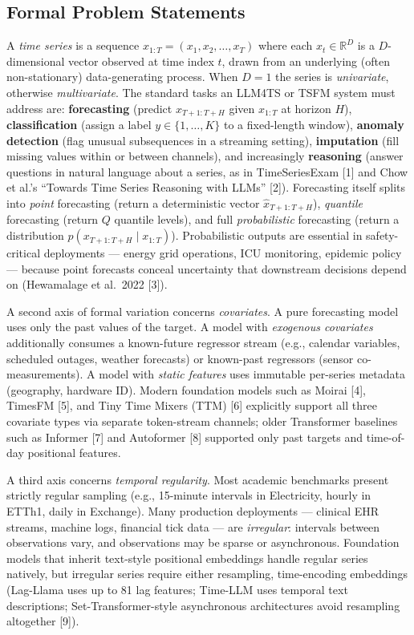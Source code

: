\documentclass{article}
\begin{document}
\subsection{Formal Problem Statements}\label{formal-problem-statements}

A \emph{time series} is a sequence \(x_{1:T} = (x_1, x_2, \ldots, x_T)\) where each \(x_t \in \mathbb{R}^D\) is a \(D\)-dimensional vector observed at time index \(t\), drawn from an underlying (often non-stationary) data-generating process. When \(D=1\) the series is \emph{univariate}, otherwise \emph{multivariate}. The standard tasks an LLM4TS or TSFM system must address are: \textbf{forecasting} (predict \(x_{T+1:T+H}\) given \(x_{1:T}\) at horizon \(H\)), \textbf{classification} (assign a label \(y \in \{1,\ldots,K\}\) to a fixed-length window), \textbf{anomaly detection} (flag unusual subsequences in a streaming setting), \textbf{imputation} (fill missing values within or between channels), and increasingly \textbf{reasoning} (answer questions in natural language about a series, as in TimeSeriesExam {[}1{]} and Chow et al.'s ``Towards Time Series Reasoning with LLMs'' {[}2{]}). Forecasting itself splits into \emph{point} forecasting (return a deterministic vector \(\hat{x}_{T+1:T+H}\)), \emph{quantile} forecasting (return \(Q\) quantile levels), and full \emph{probabilistic} forecasting (return a distribution \(p(x_{T+1:T+H} \mid x_{1:T})\)). Probabilistic outputs are essential in safety-critical deployments --- energy grid operations, ICU monitoring, epidemic policy --- because point forecasts conceal uncertainty that downstream decisions depend on (Hewamalage et al.~2022 {[}3{]}).

A second axis of formal variation concerns \emph{covariates}. A pure forecasting model uses only the past values of the target. A model with \emph{exogenous covariates} additionally consumes a known-future regressor stream (e.g., calendar variables, scheduled outages, weather forecasts) or known-past regressors (sensor co-measurements). A model with \emph{static features} uses immutable per-series metadata (geography, hardware ID). Modern foundation models such as Moirai {[}4{]}, TimesFM {[}5{]}, and Tiny Time Mixers (TTM) {[}6{]} explicitly support all three covariate types via separate token-stream channels; older Transformer baselines such as Informer {[}7{]} and Autoformer {[}8{]} supported only past targets and time-of-day positional features.

A third axis concerns \emph{temporal regularity}. Most academic benchmarks present strictly regular sampling (e.g., 15-minute intervals in Electricity, hourly in ETTh1, daily in Exchange). Many production deployments --- clinical EHR streams, machine logs, financial tick data --- are \emph{irregular}: intervals between observations vary, and observations may be sparse or asynchronous. Foundation models that inherit text-style positional embeddings handle regular series natively, but irregular series require either resampling, time-encoding embeddings (Lag-Llama uses up to 81 lag features; Time-LLM uses temporal text descriptions; Set-Transformer-style asynchronous architectures avoid resampling altogether {[}9{]}).
\end{document}
